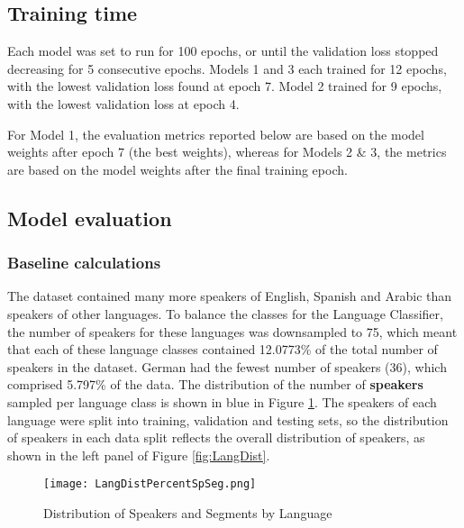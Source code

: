 \documentclass[11pt, letterpaper]{article}
\begin{document}
\subsection{Training time}

Each model was set to run for 100 epochs, or until the validation loss stopped decreasing for 5 consecutive epochs. Models 1 and 3 each trained for 12 epochs, with the lowest validation loss found at epoch 7. Model 2 trained for 9 epochs, with the lowest validation loss at epoch 4. 

For Model 1, the evaluation metrics reported below are based on the model weights after epoch 7 (the best weights), whereas for Models 2 \& 3, the metrics are based on the model weights after the final training epoch.

\subsection{Model evaluation}
\subsubsection{Baseline calculations}

The dataset contained many more speakers of English, Spanish and Arabic than speakers of other languages. To balance the classes for the Language Classifier, the number of speakers for these languages was downsampled to 75, which meant that each of these language classes contained 12.0773\% of the total number of speakers in the dataset. German had the fewest number of speakers (36), which comprised 5.797\% of the data. The distribution of the number of \textbf{speakers} sampled per language class is shown in blue in Figure \ref{fig:LangDistTot}. The speakers of each language were split into training, validation and testing sets, so the distribution of speakers in each data split reflects the overall distribution of speakers, as shown in the left panel of Figure \ref{fig:LangDist}.

\begin{figure}[h]
\begin{center}
\texttt{[image: LangDistPercentSpSeg.png]}
\caption{Distribution of Speakers and Segments by Language}
\label{fig:LangDistTot}
\end{center}
\end{figure}
\end{document}
